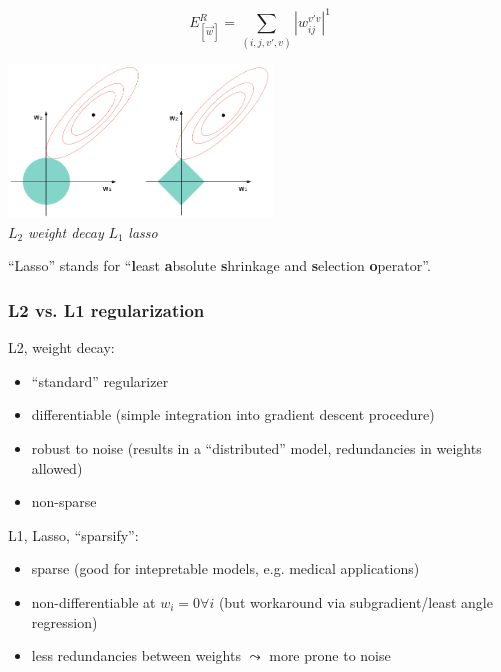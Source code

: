 \begin{frame}\frametitle{\subsecname}

	\begin{equation}
		E^R_{[\vec w]} = \sum\limits_{(i, j, v', v)} {|w_{ij}^{v'v}|}^1
	\end{equation}
	
	\begin{center}
		\includegraphics[width=7cm]{img/RegularizationTypesIntersect_clean.png} \\[-2mm]
		{ \footnotesize $L_2$ {\em weight decay}
			\hspace{1cm} $L_1$ {\em lasso}\hspace{1cm} $ $}
	\end{center}
	
	``Lasso'' stands for ``\textbf{l}east \textbf{a}bsolute \textbf{s}hrinkage and \textbf{s}election \textbf{o}perator''.


\end{frame}

\begin{frame}\frametitle{L2 vs. L1 regularization}

L2, weight decay:
\begin{itemize}
\item ``standard'' regularizer
\item differentiable (simple integration into gradient descent procedure)
\item robust to noise (results in a ``distributed'' model, redundancies in weights allowed)
\item non-sparse
\end{itemize}

\pause

L1, Lasso, ``sparsify'':

\begin{itemize}
\item sparse (good for intepretable models, e.g. medical applications)
\item non-differentiable at $w_i = 0 \forall i$ (but workaround via subgradient/least angle regression)
\item less redundancies between weights $\leadsto$ more prone to noise
\end{itemize}


\end{frame}

